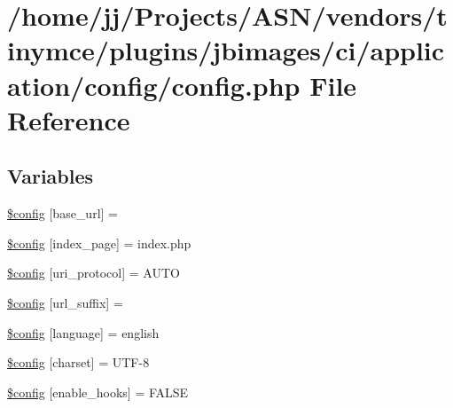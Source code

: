 \hypertarget{ci_2application_2config_2config_8php}{}\section{/home/jj/\+Projects/\+A\+S\+N/vendors/tinymce/plugins/jbimages/ci/application/config/config.php File Reference}
\label{ci_2application_2config_2config_8php}
\subsection*{Variables}
\begin{DoxyCompactItemize}
\item 
\hyperlink{ci_2application_2config_2config_8php_a8063081991a9d7087e6aea78db95a524}{\$config} \mbox{[}\textquotesingle{}base\+\_\+url\textquotesingle{}\mbox{]} = \textquotesingle{}\textquotesingle{}
\item 
\hyperlink{ci_2application_2config_2config_8php_a64d47dc21f6eab24bf747cae9da5e7bb}{\$config} \mbox{[}\textquotesingle{}index\+\_\+page\textquotesingle{}\mbox{]} = \textquotesingle{}index.\+php\textquotesingle{}
\item 
\hyperlink{ci_2application_2config_2config_8php_a37a0ed82a5db3c3aebdc12611e1e4498}{\$config} \mbox{[}\textquotesingle{}uri\+\_\+protocol\textquotesingle{}\mbox{]} = \textquotesingle{}A\+U\+TO\textquotesingle{}
\item 
\hyperlink{ci_2application_2config_2config_8php_a40da61bb27389d4c21a1271840ec7c40}{\$config} \mbox{[}\textquotesingle{}url\+\_\+suffix\textquotesingle{}\mbox{]} = \textquotesingle{}\textquotesingle{}
\item 
\hyperlink{ci_2application_2config_2config_8php_ae05e29ba794fe4453013dd7b1cc30219}{\$config} \mbox{[}\textquotesingle{}language\textquotesingle{}\mbox{]} = \textquotesingle{}english\textquotesingle{}
\item 
\hyperlink{ci_2application_2config_2config_8php_ac9128ac0276b1b7acf4c96a22b2469f1}{\$config} \mbox{[}\textquotesingle{}charset\textquotesingle{}\mbox{]} = \textquotesingle{}U\+TF-\/8\textquotesingle{}
\item 
\hyperlink{ci_2application_2config_2config_8php_a2d80c3b160b2bb6f3329a9b07e970c51}{\$config} \mbox{[}\textquotesingle{}enable\+\_\+hooks\textquotesingle{}\mbox{]} = F\+A\+L\+SE
\item 

\end{DoxyCompactItemize}
